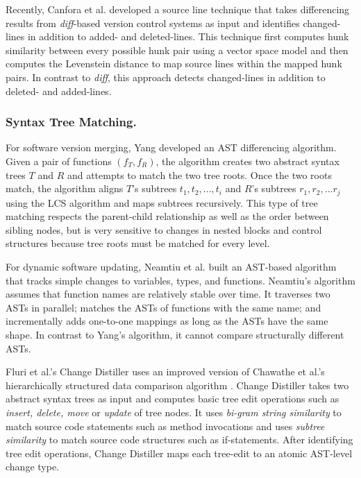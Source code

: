 \documentclass[runningheads,a4paper]{llncs}
\begin{document}
Recently, Canfora et al. \cite{Canfora2007} developed a source line technique that takes differencing results from {\it diff}-based version control systems as input and identifies changed-lines in addition to added- and deleted-lines. This technique first computes hunk similarity between every possible hunk pair using a vector space model and then computes the Levenstein distance \cite{Levenstein1966} to map source lines within the mapped hunk pairs. In contrast to {\it diff}, this approach detects changed-lines in addition to deleted- and added-lines. 

\subsubsection{Syntax Tree Matching.}
For software version merging, Yang \cite{Yang1991} developed an AST differencing algorithm. Given a pair of functions $(f_T,f_R)$, the algorithm creates two abstract syntax trees $T$ and $R$ and attempts to match the two tree roots. Once the two roots match, the algorithm aligns $T$'s subtrees ${t_1, t_2, ..., t_i}$ and $R$'s subtrees ${r_1, r_2, ... r_j}$ using the LCS algorithm and maps subtrees recursively. This type of tree matching respects the parent-child relationship as well as the order between sibling nodes, but is very sensitive to changes in nested blocks and control structures because tree roots must be matched for every level. 

For dynamic software updating, Neamtiu et al. \cite{Neamtiu2005} built an AST-based algorithm that tracks simple changes to variables, types, and functions. Neamtiu's algorithm assumes that function names are relatively stable over time. 
It
traverses two ASTs in parallel;
matches the ASTs of functions with the same name; 
and incrementally adds one-to-one mappings as long as the ASTs have the same shape. In contrast to Yang's algorithm, it cannot compare structurally different ASTs. 

Fluri et al.'s Change Distiller \cite{FWP2007} uses an improved version of Chawathe et al.'s hierarchically structured data comparison algorithm \cite{Chawathe1996}. Change Distiller takes two abstract syntax trees as input and computes basic tree edit operations such as {\it insert, delete, move} or {\it update} of tree nodes. It uses {\it bi-gram string similarity} to match source code statements such as method invocations and uses {\it subtree similarity} to match source code structures such as if-statements. After identifying tree edit operations, Change Distiller maps each tree-edit to an atomic AST-level change type. 
\end{document}

